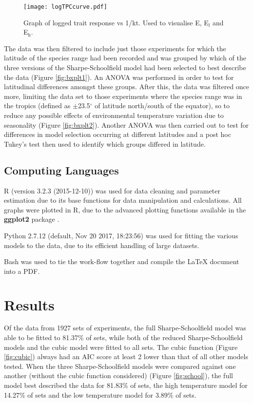 \documentclass[a4paper, 11pt]{article}
\begin{document}
\begin{linenumbers}
\begin{figure}[H]
\centering
\texttt{[image: logTPCcurve.pdf]}
\caption{\label{fig:eg log TPC} Graph of logged trait response vs 1/kt. Used to visualise E, E$_{\text{l}}$ and E$_{\text{h}}$.}
\end{figure}



The data was then filtered to include just those experiments for which the latitude of the species range had been recorded and was grouped by which of the three versions of the Sharpe-Schoolfield model had been selected to best describe the data (Figure \ref{fig:bxplt1}). An ANOVA was performed in order to test for latitudinal differences amongst these groups.  After this, the data was filtered once more, limiting the data set to those experiments where the species range was in the tropics (defined as $\pm$23.5$^{\circ}$ of latitude north/south of the equator), so to reduce any possible effects of environmental temperature variation due to seasonality (Figure \ref{fig:bxplt2}). Another ANOVA was then carried out to test for differences in model selection occurring at different latitudes and a post hoc Tukey's test then used to identify which groups differed in latitude.

\subsection{Computing Languages}

R (version 3.2.3 (2015-12-10)) was used for data cleaning and parameter estimation due to its base functions for data manipulation and calculations. All graphs were plotted in R, due to the advanced plotting functions available in the \textbf{ggplot2} package \citep{ggplot}. 

Python 2.7.12 (default, Nov 20 2017, 18:23:56) was used for fitting the various models to the data, due to its efficient handling of large datasets.

Bash was used to tie the work-flow together and compile the LaTeX document into a PDF.

\section{Results}

Of the data from 1927 sets of experiments, the full Sharpe-Schoolfield model was able to be fitted to 81.37\% of sets, while both of the reduced Sharpe-Schoolfield models and the cubic model were fitted to all sets. The cubic function (Figure \ref{fig:cubic}) always had an AIC score at least 2 lower than that of all other models tested. When the three Sharpe-Schoolfield models were compared against one another (without the cubic function considered) (Figure \ref{fig:school}), the full model best described the data for 81.83\% of sets, the high temperature model for 14.27\% of sets and the low temperature model for 3.89\% of sets.




\end{linenumbers}
\end{document}
